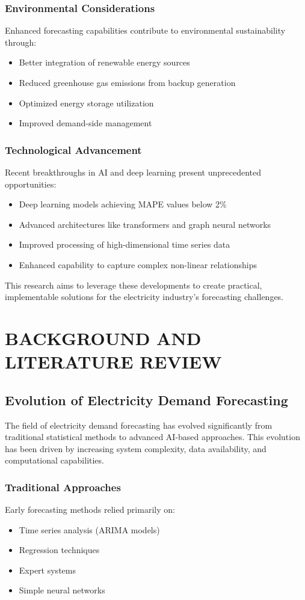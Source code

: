 \documentclass[12pt,a4paper]{report}
\begin{document}
\subsection{Environmental Considerations}
Enhanced forecasting capabilities contribute to environmental sustainability through:
\begin{itemize}
\item Better integration of renewable energy sources
\item Reduced greenhouse gas emissions from backup generation
\item Optimized energy storage utilization
\item Improved demand-side management
\end{itemize}

\subsection{Technological Advancement}
Recent breakthroughs in AI and deep learning present unprecedented opportunities:
\begin{itemize}
\item Deep learning models achieving MAPE values below 2\%
\item Advanced architectures like transformers and graph neural networks
\item Improved processing of high-dimensional time series data
\item Enhanced capability to capture complex non-linear relationships
\end{itemize}

This research aims to leverage these developments to create practical, implementable solutions for the electricity industry's forecasting challenges.


\chapter{BACKGROUND AND LITERATURE REVIEW}
\section{Evolution of Electricity Demand Forecasting}
The field of electricity demand forecasting has evolved significantly from traditional statistical methods to advanced AI-based approaches. This evolution has been driven by increasing system complexity, data availability, and computational capabilities.

\subsection{Traditional Approaches}
Early forecasting methods relied primarily on:
\begin{itemize}
\item Time series analysis (ARIMA models)
\item Regression techniques
\item Expert systems
\item Simple neural networks
\end{itemize}
\end{document}
